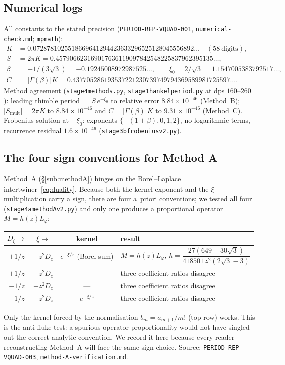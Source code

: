 \documentclass[11pt,reqno]{amsart}
\renewcommand{\_}{\vquadorigunderscore\allowbreak}
\theoremstyle{plain}
\theoremstyle{definition}
\newcommand{\Lphi}{L_{\varphi}}
\newcommand{\xizero}{\xi_0}
\providecommand{\C}{}\renewcommand{\C}{C}
\begin{document}
\subsection{Numerical logs}\label{app:numlogs}
All constants to the stated precision (\texttt{PERIOD-REP-VQUAD-001},
\texttt{numerical-check.md}; \texttt{mpmath}):
{\small
\[
\begin{aligned}
  K&=0.0728781025518669641294423633296525128045556892\ldots\quad(58\ \text{digits}),\\
  S&=2\pi K=0.457906623169017636119097842548225837962395135\ldots,\\
  \beta&=-1/(3\sqrt3)=-0.19245008972987525\ldots,\qquad \xizero=2/\sqrt3=1.1547005383792517\ldots,\\
  \C&=\lvert\Gamma(\beta)\rvert K=0.437705286193537221230739749794369589981725597\ldots.
\end{aligned}
\]
}
Method agreement (\texttt{stage4\_methods.py}, \texttt{stage1\_hankel\_period.py} at dps
$160$--$260$): leading thimble period $=S\,e^{-\xizero}$ to relative error $8.84\times10^{-46}$
(Method~B); $\lvert S_{\mathrm{mult}}\rvert=2\pi K$ to $8.84\times10^{-46}$ and
$\C=\lvert\Gamma(\beta)\rvert K$ to $9.31\times10^{-46}$ (Method~C). Frobenius solution at
$-\xizero$: exponents $\{-(1+\beta),0,1,2\}$, no logarithmic terms, recurrence residual
$1.6\times10^{-46}$ (\texttt{stage3b\_frobenius\_v2.py}).

\subsection{The four sign conventions for Method A}\label{app:conventions}
Method~A (\S\ref{sub:methodA}) hinges on the Borel--Laplace intertwiner~\eqref{eq:duality}. Because
both the kernel exponent and the $\xi$-multiplication carry a sign, there are four a~priori
conventions; we tested all four (\texttt{stage4a\_methodA\_v2.py}) and only one produces a
proportional operator $M=h(z)\Lphi$:
\begin{center}
\begin{tabular}{@{}cccl@{}}
\hline
$D_\xi\mapsto$ & $\xi\mapsto$ & kernel & result \\
\hline
$+1/z$ & $+z^2D_z$ & $e^{-\xi/z}$ (Borel sum) & $M=h(z)\Lphi$, $h=\dfrac{27(649+30\sqrt3)}{418501\,z^2(2\sqrt3-3)}$ \\
$+1/z$ & $-z^2D_z$ & --- & three coefficient ratios disagree \\
$-1/z$ & $+z^2D_z$ & --- & three coefficient ratios disagree \\
$-1/z$ & $-z^2D_z$ & $e^{+\xi/z}$ & three coefficient ratios disagree \\
\hline
\end{tabular}
\end{center}
Only the kernel forced by the normalisation $b_m=a_{m+1}/m!$ (top row) works. This is the
anti-fluke test: a spurious operator proportionality would not have singled out the correct
analytic convention. We record it here because every reader reconstructing Method~A will face the
same sign choice. Source: \texttt{PERIOD-REP-VQUAD-003}, \texttt{method-A-verification.md}.
\end{document}
